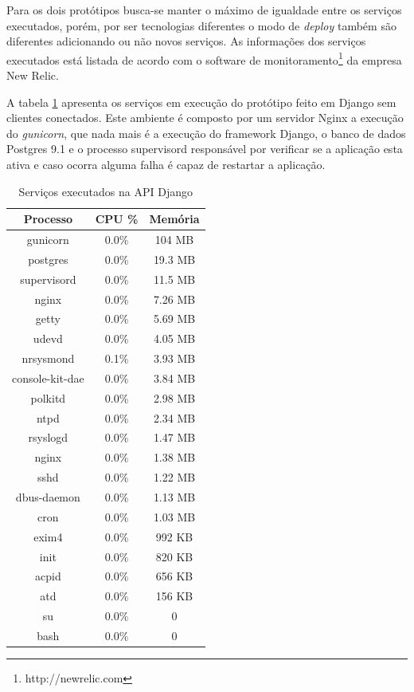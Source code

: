   Para os dois protótipos busca-se manter o máximo de igualdade entre os serviços executados, porém, por ser 
  tecnologias diferentes o modo de \textit{deploy} também são diferentes adicionando ou não novos serviços. 
  As informações dos serviços executados está listada de acordo com o software de monitoramento\footnote{http://newrelic.com}
  da empresa New Relic.
  
  A tabela \ref{tab:services-in-api-django} apresenta os serviços em execução do protótipo feito em Django sem clientes conectados.
  Este ambiente é composto por um servidor Nginx a execução do \textit{gunicorn},
  que nada mais é a execução do framework Django, o banco de dados Postgres 9.1 e o processo supervisord responsável por
  verificar se a aplicação esta ativa e caso ocorra alguma falha é capaz de restartar a aplicação.
  
  \begin{table}[H]
    \centering
    \footnotesize
    \setlength{\abovecaptionskip}{0pt}
    \setlength{\belowcaptionskip}{0pt}
    \caption[Serviços executados na API Django]{Serviços executados na API Django}
    \label{tab:services-in-api-django}
    \begin{tabular}{c|c|c}
      \hline \hline
      Processo  & 	CPU \% &	Memória \\
      \hline \hline
      gunicorn &	0.0\% &		104 MB \\
      postgres &	0.0\% &		19.3 MB \\
      supervisord &	0.0\% &		11.5 MB \\
      nginx &		0.0\% &		7.26 MB \\
      getty &		0.0\% &		5.69 MB \\
      udevd &		0.0\% &		4.05 MB \\
      nrsysmond &	0.1\% &		3.93 MB \\
      console-kit-dae &	0.0\% &		3.84 MB \\
      polkitd &	 	0.0\% &		2.98 MB \\
      ntpd &		0.0\% &		2.34 MB \\
      rsyslogd &	0.0\% &		1.47 MB \\
      nginx &		0.0\% &		1.38 MB \\
      sshd &		0.0\% &		1.22 MB \\
      dbus-daemon &	0.0\% &		1.13 MB \\
      cron &		0.0\% &		1.03 MB \\
      exim4 &		0.0\% &		992 KB \\
      init &		0.0\% &		820 KB \\
      acpid &		0.0\% &		656 KB \\
      atd &		0.0\% &		156 KB \\
      su &		0.0\% &		0 \\
      bash &		0.0\% &		0 \\
      \hline \hline
    \end{tabular}
  \end{table}
  
